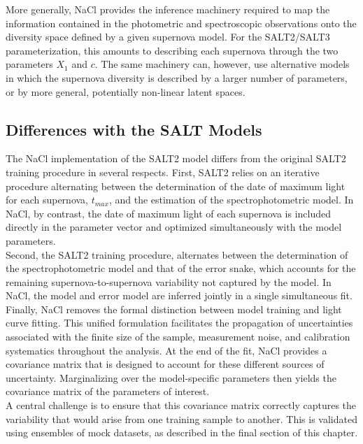 More generally, NaCl provides the inference machinery required to map 
the information contained in the photometric and spectroscopic 
observations onto the diversity space defined by a given supernova 
model. For the SALT2/SALT3 parameterization, this amounts to 
describing each supernova through the two parameters $X_1$ and $c$. 
The same machinery can, however, use alternative models in which the 
supernova diversity is described by a larger number of parameters, or 
by more general, potentially non-linear latent spaces. 

\subsection{Differences with the SALT Models}


The NaCl implementation of the SALT2 model differs from the original 
SALT2 training procedure in several respects. First, SALT2 relies on 
an iterative procedure alternating between the determination of the 
date of maximum light for each supernova, $t_{max}$, and the estimation of the 
spectrophotometric model. In NaCl, by contrast, the date of maximum 
light of each supernova is included directly in the parameter vector 
and optimized simultaneously with the model parameters. \\

Second, the SALT2 training procedure, alternates between the 
determination of the spectrophotometric model and that of the error 
snake, which accounts for the remaining supernova-to-supernova variability not 
captured by the model. In NaCl, the model and error model are inferred 
jointly in a single simultaneous fit. \\

Finally, NaCl removes the formal distinction between model training 
and light curve fitting. This unified formulation facilitates the 
propagation of uncertainties associated with the finite size of the 
sample, measurement noise, and calibration systematics throughout the 
analysis. At the end of the fit, NaCl provides a covariance matrix 
that is designed to account for these different sources of uncertainty. 
Marginalizing over the model-specific parameters then yields the 
covariance matrix of the parameters of interest. \\

A central challenge is to ensure that this covariance matrix correctly 
captures the variability that would arise from one training sample to
another. This is validated using ensembles of mock datasets, as 
described in the final section of this chapter. \\

